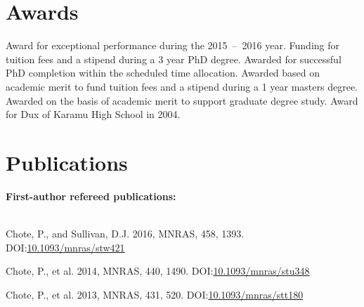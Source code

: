 \documentclass[print]{cv-style}
\begin{document}

\section{Awards}
\begin{entrylist}
{Award for exceptional performance during the 2015~--~2016 year.}
{Funding for tuition fees and a stipend during a 3 year PhD degree.}
{Awarded for successful PhD completion within the scheduled time allocation.}
{Awarded based on academic merit to fund tuition fees and a stipend during a 1 year masters degree.}
{Awarded on the basis of academic merit to support graduate degree study.}
\vspace{-3mm}
\vspace{-3mm}
{Award for Dux of Karamu High School in 2004.}
\end{entrylist}



\section{Publications}
{\bf First-author refereed publications:}\\
~\vspace{-2mm}\\
\begin{entrylist}
  {\small Chote, P., and Sullivan, D.J. 2016, MNRAS, 458, 1393. \textsc{DOI:}\href{http://dx.doi.org/10.1093/mnras/stw421}{10.1093/mnras/stw421}}

  {\small Chote, P., et al. 2014, MNRAS, 440, 1490. \textsc{DOI:}\href{http://dx.doi.org/10.1093/mnras/stu348}{10.1093/mnras/stu348}}
  
  {\small Chote, P., et al. 2013, MNRAS, 431, 520. \textsc{DOI:}\href{http://dx.doi.org/10.1093/mnras/stt180}{10.1093/mnras/stt180}}
\end{entrylist}\\
\pagebreak\\
\end{document}
